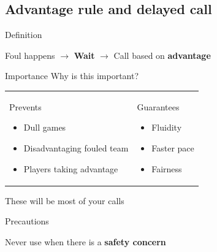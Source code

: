 \documentclass{beamer}
\begin{document}
    \subsection{Advantage rule and delayed call}

    \begin{frame}{Definition}
        \begin{center}
            Foul happens \pause
            $\rightarrow$ \textbf{Wait} \pause
            $\rightarrow$ Call based on \textbf{advantage}
        \end{center}
    \end{frame}

    \begin{frame}{Importance}
        Why is this important? \pause

        \begin{tabular}{ll}
            \parbox{0.5\textwidth}
            {
                \begin{center}
                    Prevents
                \end{center}
                \begin{itemize}
                    \item Dull games
                    \item Disadvantaging fouled team
                    \item Players taking advantage
                \end{itemize}
            }
            \pause
            &
            \parbox{0.5\textwidth}
            {
                \begin{center}
                    Guarantees
                \end{center}
                \begin{itemize}
                    \item Fluidity
                    \item Faster pace
                    \item Fairness
                \end{itemize}
            }
        \end{tabular}
        \pause
        \begin{center}
            These will be most of your calls
        \end{center}
    \end{frame}

    \begin{frame}{Precautions}
        \begin{center}
            Never use when there is a \textbf{safety concern}
        \end{center}
    \end{frame}
\end{document}
